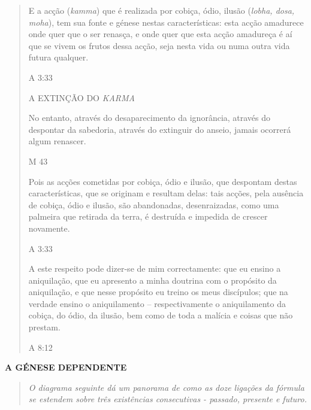 \begin{quote}
E a acção (\emph{kamma}) que é realizada por cobiça, ódio, ilusão (\emph{lobha, dosa, moha}), tem sua fonte e génese nestas características: esta acção amadurece onde quer que o ser renasça, e onde quer que esta acção amadureça é aí que se vivem os frutos dessa acção, seja nesta vida ou numa outra vida futura qualquer.

A 3:33

A EXTINÇÃO DO \emph{KARMA}

No entanto, através do desaparecimento da ignorância, através do despontar da sabedoria, através do extinguir do anseio, jamais ocorrerá algum renascer.

M 43

Pois as acções cometidas por cobiça, ódio e ilusão, que despontam destas características, que se originam e resultam delas: tais acções, pela ausência de cobiça, ódio e ilusão, são abandonadas, desenraizadas, como uma palmeira que retirada da terra, é destruída e impedida de crescer novamente.

A 3:33

A este respeito pode dizer-se de mim correctamente: que eu ensino a aniquilação, que eu apresento a minha doutrina com o propósito da aniquilação, e que nesse propósito eu treino os meus discípulos; que na verdade ensino o aniquilamento -- respectivamente o aniquilamento da cobiça, do ódio, da ilusão, bem como de toda a malícia e coisas que não prestam.

A 8:12
\end{quote}

\textbf{A GÉNESE DEPENDENTE}

\begin{quote}
\emph{O diagrama seguinte dá um panorama de como as doze ligações da fórmula se estendem sobre três existências consecutivas - passado, presente e futuro.}
\end{quote}


